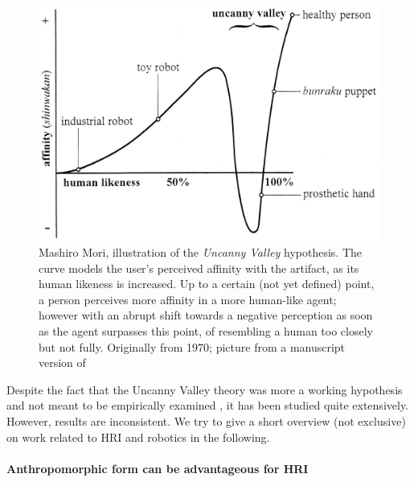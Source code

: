 \documentclass{frontiersSCNS} %
\begin{document}
\begin{figure}\centering
  \includegraphics[scale=0.75]{uncanny-valley.jpg}
 \caption{Mashiro Mori, illustration of the \textit{Uncanny Valley} hypothesis. The curve models the user's perceived affinity with the artifact, as its human likeness is increased. Up to a certain (not yet defined) point, a person perceives more affinity in a more human-like agent; however with an abrupt shift towards a negative perception as soon as the agent surpasses this point, of resembling a human too closely but not fully. Originally from 1970; picture from a manuscript version of \cite{mori_uncanny_2012}}
 \label{fig:uncanny_valley}       %
 \end{figure}

Despite the fact that the Uncanny Valley theory was more a working hypothesis and not 
meant to be empirically examined \citep{cheetham_human_2011}, it has been studied quite 
extensively. However, results are inconsistent. We try to give a short overview (not 
exclusive) on work related to HRI and robotics in the following. 
 
 
\paragraph*{Anthropomorphic form can be advantageous for HRI\\}
\end{document}
